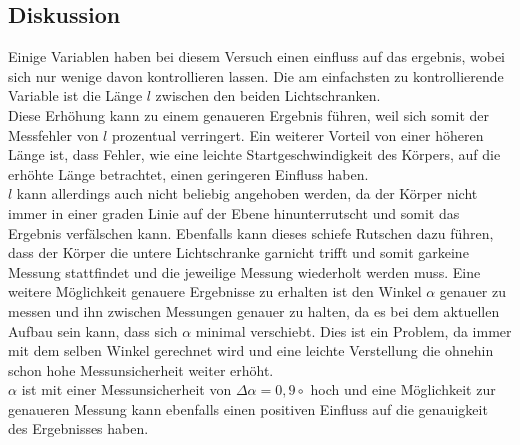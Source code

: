 \subsection{Diskussion}
Einige Variablen haben bei diesem Versuch einen einfluss auf das ergebnis, wobei sich nur wenige davon kontrollieren lassen. Die am einfachsten zu kontrollierende Variable ist die Länge $l$ zwischen den beiden Lichtschranken.
\\
Diese Erhöhung kann zu einem genaueren Ergebnis führen, weil sich somit der Messfehler von $l$ prozentual verringert. Ein weiterer Vorteil von einer höheren Länge ist, dass Fehler, wie eine leichte Startgeschwindigkeit des Körpers, auf die erhöhte Länge betrachtet, einen geringeren Einfluss haben. \\ $l$ kann allerdings auch nicht beliebig angehoben werden, da der Körper nicht immer in einer graden Linie auf der Ebene hinunterrutscht und somit das Ergebnis verfälschen kann. Ebenfalls kann dieses schiefe Rutschen dazu führen, dass der Körper die untere Lichtschranke garnicht trifft und somit garkeine Messung stattfindet und die jeweilige Messung wiederholt werden muss.\bigbreak 
Eine weitere Möglichkeit genauere Ergebnisse zu erhalten ist den Winkel $\alpha$ genauer zu messen und ihn zwischen Messungen genauer zu halten, da es bei dem aktuellen Aufbau sein kann, dass sich $\alpha$ minimal verschiebt. Dies ist ein Problem, da immer mit dem selben Winkel gerechnet wird und eine leichte Verstellung die ohnehin schon hohe Messunsicherheit weiter erhöht. \\ $\alpha$ ist mit einer Messunsicherheit von $\Delta \alpha = 0,9\circ$ hoch und eine Möglichkeit zur genaueren Messung kann ebenfalls einen positiven Einfluss auf die genauigkeit des Ergebnisses haben.